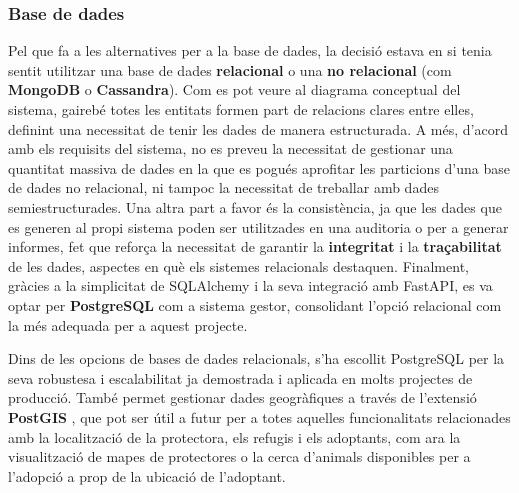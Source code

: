 \documentclass[11pt,a4paper]{report}
\begin{document}
\subsubsection{Base de dades}
Pel que fa a les alternatives per a la base de dades, la decisió estava en si tenia sentit utilitzar una base de dades \textbf{relacional} o una \textbf{no relacional} (com \textbf{MongoDB} o \textbf{Cassandra}). Com es pot veure al diagrama conceptual del sistema, gairebé totes les entitats formen part de relacions clares entre elles, definint una necessitat de tenir les dades de manera estructurada. A més, d'acord amb els requisits del sistema, no es preveu la necessitat de gestionar una quantitat massiva de dades en la que es pogués aprofitar les particions d'una base de dades no relacional, ni tampoc la necessitat de treballar amb dades semiestructurades.
Una altra part a favor és la consistència, ja que les dades que es generen al propi sistema poden ser utilitzades en una auditoria o per a generar informes, fet que reforça la necessitat de garantir la \textbf{integritat} i la \textbf{traçabilitat} de les dades, aspectes en què els sistemes relacionals destaquen.
Finalment, gràcies a la simplicitat de SQLAlchemy i la seva integració amb FastAPI, es va optar per \textbf{PostgreSQL} com a sistema gestor, consolidant l'opció relacional com la més adequada per a aquest projecte.

Dins de les opcions de bases de dades relacionals, s'ha escollit PostgreSQL per la seva robustesa i escalabilitat ja demostrada i aplicada en molts projectes de producció. També permet gestionar dades geogràfiques a través de l'extensió \textbf{PostGIS} \cite{noauthor_postgis_nodate}, que pot ser útil a futur per a totes aquelles funcionalitats relacionades amb la localització de la protectora, els refugis i els adoptants, com ara la visualització de mapes de protectores o la cerca d'animals disponibles per a l'adopció a prop de la ubicació de l'adoptant.
\end{document}
